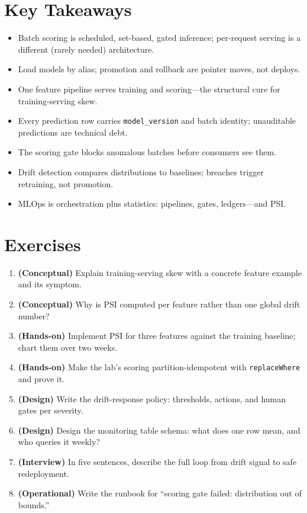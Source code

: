 \section*{Key Takeaways}
\begin{itemize}
    \item Batch scoring is scheduled, set-based, gated inference; per-request serving is a different (rarely needed) architecture.
    \item Load models by alias; promotion and rollback are pointer moves, not deploys.
    \item One feature pipeline serves training and scoring---the structural cure for training-serving skew.
    \item Every prediction row carries \texttt{model\_version} and batch identity; unauditable predictions are technical debt.
    \item The scoring gate blocks anomalous batches before consumers see them.
    \item Drift detection compares distributions to baselines; breaches trigger retraining, not promotion.
    \item MLOps is orchestration plus statistics: pipelines, gates, ledgers---and PSI.
\end{itemize}

\section{Exercises}
\begin{enumerate}
    \item \textbf{(Conceptual)} Explain training-serving skew with a concrete feature example and its symptom.
    \item \textbf{(Conceptual)} Why is PSI computed per feature rather than one global drift number?
    \item \textbf{(Hands-on)} Implement PSI for three features against the training baseline; chart them over two weeks.
    \item \textbf{(Hands-on)} Make the lab's scoring partition-idempotent with \texttt{replaceWhere} and prove it.
    \item \textbf{(Design)} Write the drift-response policy: thresholds, actions, and human gates per severity.
    \item \textbf{(Design)} Design the monitoring table schema: what does one row mean, and who queries it weekly?
    \item \textbf{(Interview)} In five sentences, describe the full loop from drift signal to safe redeployment.
    \item \textbf{(Operational)} Write the runbook for ``scoring gate failed: distribution out of bounds.''
\end{enumerate}

